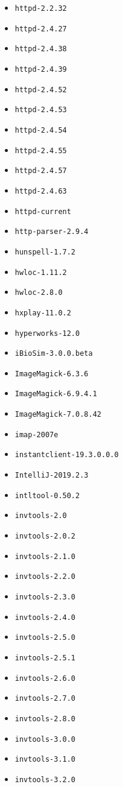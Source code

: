 \begin{multicols}{3}
\begin{itemize}
\item \verb|httpd-2.2.32|
\item \verb|httpd-2.4.27|
\item \verb|httpd-2.4.38|
\item \verb|httpd-2.4.39|
\item \verb|httpd-2.4.52|
\item \verb|httpd-2.4.53|
\item \verb|httpd-2.4.54|
\item \verb|httpd-2.4.55|
\item \verb|httpd-2.4.57|
\item \verb|httpd-2.4.63|
\item \verb|httpd-current|
\item \verb|http-parser-2.9.4|
\item \verb|hunspell-1.7.2|
\item \verb|hwloc-1.11.2|
\item \verb|hwloc-2.8.0|
\item \verb|hxplay-11.0.2|
\item \verb|hyperworks-12.0|
\item \verb|iBioSim-3.0.0.beta|
\item \verb|ImageMagick-6.3.6|
\item \verb|ImageMagick-6.9.4.1|
\item \verb|ImageMagick-7.0.8.42|
\item \verb|imap-2007e|
\item \verb|instantclient-19.3.0.0.0|
\item \verb|IntelliJ-2019.2.3|
\item \verb|intltool-0.50.2|
\item \verb|invtools-2.0|
\item \verb|invtools-2.0.2|
\item \verb|invtools-2.1.0|
\item \verb|invtools-2.2.0|
\item \verb|invtools-2.3.0|
\item \verb|invtools-2.4.0|
\item \verb|invtools-2.5.0|
\item \verb|invtools-2.5.1|
\item \verb|invtools-2.6.0|
\item \verb|invtools-2.7.0|
\item \verb|invtools-2.8.0|
\item \verb|invtools-3.0.0|
\item \verb|invtools-3.1.0|
\item \verb|invtools-3.2.0|

\end{itemize}
\end{multicols}
